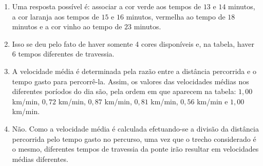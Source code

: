 \documentclass[10 pt,usenames,dvipsnames, oneside]{article}
\begin{document}
\ifdefined\prof\clearpage
\begin{solucao}
\begin{enumerate}
\item {} 
Uma resposta possível é: associar a cor verde aos tempos de $13$ e $14$ minutos, a cor laranja aos tempos de $15$ e $16$ minutos, vermelha ao tempo de $18$ minutos e a cor vinho ao tempo de $23$ minutos.
\item {} 
Isso se deu pelo fato de haver somente 4 cores disponíveis e, na tabela, haver 6 tempos diferentes de travessia.

\item {} 
A velocidade média é determinada pela razão entre a distância percorrida e o tempo gasto para percorrê-la. Assim, os valores das velocidades médias nos diferentes poríodos do dia são, pela ordem em que aparecem na tabela: $1{,}00$ km/min, $0{,}72$ km/min, $0{,}87$ km/min, $0{,}81$ km/min, $0{,}56$ km/min e $1{,}00$ km/min.

\item {} 
Não. Como a velocidade média é calculada efetuando-se a divisão da distância percorrida pelo tempo gasto no percurso, uma vez que o trecho considerado é o mesmo, diferentes tempos de travessia da ponte irão resultar em velocidades médias diferentes.

\end{enumerate}
\end{solucao}
\fi
\end{document}
